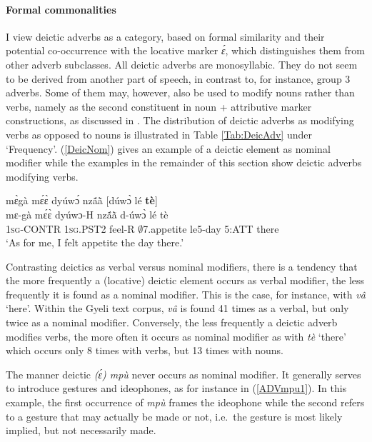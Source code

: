 \paragraph{Formal commonalities}

I view deictic adverbs as a category, based on formal similarity and their potential co-occurrence with the locative marker {\itshape ɛ́}, which distinguishes them from other adverb subclasses. 
All deictic adverbs are monosyllabic. They do not seem to be derived from another part of speech, in contrast to, for instance, group 3 adverbs. Some of them may, however, also be used to modify nouns rather than verbs, namely as the second constituent in noun + attributive marker constructions, as discussed in .  The distribution of deictic adverbs as modifying verbs as opposed to nouns is illustrated in Table \ref{Tab:DeicAdv} under `Frequency'. (\ref{DeicNom}) gives an example of a deictic element as nominal modifier while the examples in the remainder of this section show deictic adverbs modifying verbs.


\begin{exe} 
\ex\label{DeicNom} 
  \glll mɛ̀gà mɛ́ɛ̀ dyúwɔ́ nzã́ã̀ [dúwɔ̀ lé {\bfseries tè}] \\
        mɛ-gà mɛ́ɛ̀ dyúwɔ-H nzã́ã̀ d-úwɔ̀ lé tè \\
         1\textsc{sg}-CONTR 1\textsc{sg}.PST2 feel-R $\emptyset$7.appetite le5-day 5:ATT there \\
    \trans `As for me, I felt appetite the day there.'
\end{exe}

\noindent Contrasting deictics as verbal versus nominal modifiers, there is a tendency that the more frequently a (locative) deictic element occurs as verbal modifier, the less frequently it is found as a nominal modifier. This is the case, for instance, with {\itshape vâ} `here'. Within the Gyeli text corpus, {\itshape vâ} is found 41 times as a verbal, but only twice as a nominal modifier.  Conversely, the less frequently a deictic adverb modifies verbs, the more often it occurs as nominal modifier as with {\itshape tè} `there' which occurs only 8 times with verbs, but 13 times with nouns. 

%
\iffalse
The manner deictic {\itshape (ɛ́) mpù} never occurs as nominal modifier.  It generally serves to introduce gestures and ideophones, as for instance in (\ref{ADVmpu1}). In this example, the first occurrence of {\itshape mpù} frames the ideophone while the second refers to a gesture that may actually be made or not, i.e.\ the gesture is most likely implied, but not necessarily made.


